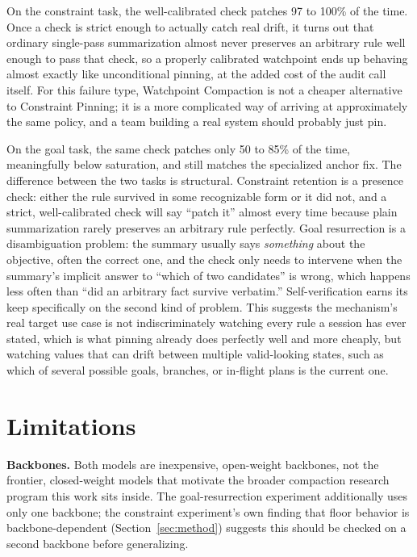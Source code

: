 \documentclass[11pt]{article}
\begin{document}
On the constraint task, the well-calibrated check patches 97 to 100\% of the time. Once a check is strict enough to actually catch real drift, it turns out that ordinary single-pass summarization almost never preserves an arbitrary rule well enough to pass that check, so a properly calibrated watchpoint ends up behaving almost exactly like unconditional pinning, at the added cost of the audit call itself. For this failure type, Watchpoint Compaction is not a cheaper alternative to Constraint Pinning; it is a more complicated way of arriving at approximately the same policy, and a team building a real system should probably just pin.

On the goal task, the same check patches only 50 to 85\% of the time, meaningfully below saturation, and still matches the specialized anchor fix. The difference between the two tasks is structural. Constraint retention is a presence check: either the rule survived in some recognizable form or it did not, and a strict, well-calibrated check will say ``patch it'' almost every time because plain summarization rarely preserves an arbitrary rule perfectly. Goal resurrection is a disambiguation problem: the summary usually says \emph{something} about the objective, often the correct one, and the check only needs to intervene when the summary's implicit answer to ``which of two candidates'' is wrong, which happens less often than ``did an arbitrary fact survive verbatim.'' Self-verification earns its keep specifically on the second kind of problem. This suggests the mechanism's real target use case is not indiscriminately watching every rule a session has ever stated, which is what pinning already does perfectly well and more cheaply, but watching values that can drift between multiple valid-looking states, such as which of several possible goals, branches, or in-flight plans is the current one.

\section{Limitations}
\label{sec:limitations}

\textbf{Backbones.} Both models are inexpensive, open-weight backbones, not the frontier, closed-weight models that motivate the broader compaction research program this work sits inside. The goal-resurrection experiment additionally uses only one backbone; the constraint experiment's own finding that floor behavior is backbone-dependent (Section~\ref{sec:method}) suggests this should be checked on a second backbone before generalizing.
\end{document}
